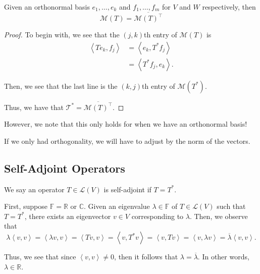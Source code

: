 \documentclass[openany]{book}
\newcommand{\CC}{\mathbb{C}}
\newcommand{\RR}{\mathbb{R}}
\newcommand{\innerproduct}[2]{\left\langle{#1}, {#2}\right\rangle}
\begin{document}
\begin{thm}
	Given an orthonormal basis $e_{1}, \ldots, e_{k}$ and $f_{1}, \ldots, f_{m}$ for $V$ and $W$ respectively, then
	\begin{equation*}
		\mathcal{M}(T) = \overline{\mathcal{M}(T)^{\intercal}}
	\end{equation*}
\end{thm}
\begin{proof}
	To begin with, we see that the $(j,k)$th entry of $\mathcal{M}(T)$ is
	\begin{align*}
		\innerproduct{Te_{k}}{f_{j}} &= \innerproduct{e_{k}}{T^{*}f_{j}} \\
		&= \innerproduct{T^{*}f_{j}}{e_{k}}.
	\end{align*}
	
	Then, we see that the last line is the $(k,j)$th entry of $\mathcal{M}(T^{*})$.
	
	Thus, we have that $\mathcal{T^{*}} =\overline{\mathcal{M}(T)^{\intercal}}$.
\end{proof}

\begin{rmk}
	However, we note that this only holds for when we have an orthonormal basis!
	
	If we only had orthogonality, we will have to adjust by the norm of the vectors.
\end{rmk}

\subsection{Self-Adjoint Operators}
We say an operator $T \in \mathcal{L}(V)$ is self-adjoint if $T = T^{*}$.

First, suppose $\mathbb{F} = \RR$ or $\CC$. Given an eigenvalue $\lambda \in \mathbb{F}$ of $T \in \mathcal{L}(V)$ such that $T = T^{*}$, there exists an eigenvector $v \in V$ corresponding to $\lambda$. Then, we observe that
\begin{equation*}
	\lambda\innerproduct{v}{v} = \innerproduct{\lambda v}{v} = \innerproduct{Tv}{v} = \innerproduct{v}{T^{*}v} = \innerproduct{v}{Tv} = \innerproduct{v}{\lambda v} = \overline{\lambda}\innerproduct{v}{v}.
\end{equation*}

Thus, we see that since $\innerproduct{v}{v} \neq 0$, then it follows that $\lambda = \overline{\lambda}$. In other words, $\lambda \in \RR$.
\end{document}
